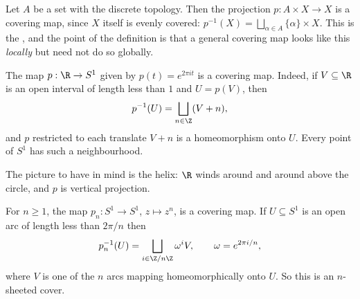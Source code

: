 \begin{example}
	Let $A$ be a set with the discrete topology. Then the projection $p: A \times X \to X$ is a covering map, since $X$ itself is evenly covered: $p^{-1}(X) = \bigsqcup_{\alpha \in A} \{\alpha\} \times X$. This is the , and the point of the definition is that a general covering map looks like this \emph{locally} but need not do so globally.
\end{example}

\begin{example} \label{ex:helix}
	The map $p: \R \to S^1$ given by $p(t) = e^{2\pi i t}$ is a covering map. Indeed, if $V \subseteq \R$ is an open interval of length less than $1$ and $U = p(V)$, then
	$$
	p^{-1}(U) = \bigsqcup_{n \in \Z} (V + n),
	$$
	and $p$ restricted to each translate $V + n$ is a homeomorphism onto $U$. Every point of $S^1$ has such a neighbourhood.
\end{example}

The picture to have in mind is the helix: $\R$ winds around and around above the circle,
and $p$ is vertical projection.

\begin{center}
\end{center}

\begin{example} \label{ex:zn-cover}
	For $n \geq 1$, the map $p_n: S^1 \to S^1$, $z \mapsto z^n$, is a covering map. If $U \subseteq S^1$ is an open arc of length less than $2\pi/n$ then
	$$
	p_n^{-1}(U) = \bigsqcup_{i \in \Z/n\Z} \omega^i V, \qquad \omega = e^{2\pi i /n},
	$$
	where $V$ is one of the $n$ arcs mapping homeomorphically onto $U$. So this is an $n$-sheeted cover.
\end{example}

